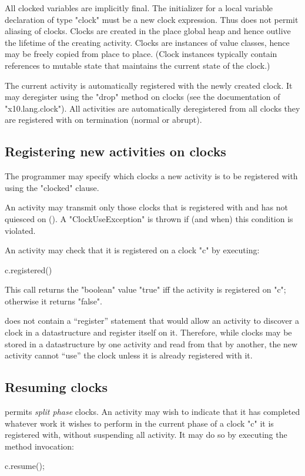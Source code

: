 All clocked variables are implicitly final. The initializer for a
local variable declaration of type \xcd"clock" must be a new clock
expression. Thus \Xten{} does not permit aliasing of clocks.
Clocks are created in the place global heap and hence outlive the
lifetime of the creating activity.  Clocks are instances of value
classes, hence may be freely copied from place to
place. (Clock instances typically contain references to mutable state
that maintains the current state of the clock.)

The current activity is automatically registered with the newly
created clock.  It may deregister using the \xcd"drop" method on
clocks (see the documentation of \xcd"x10.lang.clock"). All activities
are automatically deregistered from all clocks they are registered
with on termination (normal or abrupt).

\subsection{Registering new activities on clocks}
\label{sec:clock:register}

The programmer may specify which clocks a new activity is to be
registered with using the \xcd"clocked" clause.

An activity may transmit only those clocks that is registered with and
has not quiesced on (). 
A \xcd"ClockUseException" is
thrown if (and when) this condition is violated.

An activity may check that it is registered on a clock \xcd"c" by
executing:
\begin{xten}
c.registered()
\end{xten}
\noindent This call returns the \xcd"boolean" value \xcd"true" iff the
activity is registered on \xcd"c"; otherwise it returns \xcd"false".

\begin{note}
\Xten{} does not contain a ``register'' statement that would allow an
activity to discover a clock in a datastructure and register itself on
it. Therefore, while clocks may be stored in a datastructure by one
activity and read from that by another, the new activity cannot
``use'' the clock unless it is already registered with it.
\end{note}


\subsection{Resuming clocks}\label{resume}\label{sec:clock:resume}
\Xten{} permits {\em split phase} clocks. An activity may wish
to indicate that it has completed whatever work it wishes to perform
in the current phase of a  clock \xcd"c" it is registered with, without
suspending all activity. It may do so  by executing the method
invocation:
\begin{xten}
c.resume();
\end{xten}

